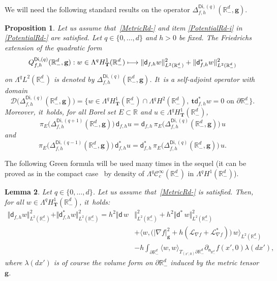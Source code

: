 \documentclass[10pt]{amsart}
\newcommand\mto{\mathchoice{\longmapsto}{\mapsto}{\mapsto}{\mapsto}}
\newcommand{\mbf}[1]{\mathbf{#1}}
\let\lp\langle
\let\rp\rangle
\let\pa\partial
\theoremstyle{plain}
\newtheorem{proposition}{Proposition}
\newtheorem{lemma}[proposition]{Lemma}
\theoremstyle{definition}
\begin{document}
We will need the following standard results on the operator
$\Delta_{f,h}^{\mathsf{Di},(q)}(\mathbb R^d_-,\mbf g)$.

\begin{proposition}\label{pr.pr1-d}
Let us assume that~\ref{MetricRd-} and item \eqref{PotentialRd-i} in
\ref{PotentialRd-} are satisfied. Let $q\in \{0,\ldots,d\}$
and $h>0$ be fixed. The
Friedrichs extension of the quadratic form
\begin{equation}\label{eq.fried-e}
Q_{f,h}^{\mathsf{Di},(q)}(\mathbb R^d_-,\mbf g): w\in \Lambda^qH^1_{\mbf T}(\mathbb R^d_-)
\mto \Vert \mathsf d_{f,h}w \Vert_{L^2(\mathbb R^d_-)}^2 + \Vert \mathsf d_{f,h}^*w \Vert_{L^2(\mathbb R^d_-)}^2
\end{equation}
on $\Lambda^qL^2(\mathbb R^d_-)$ is denoted by
$\Delta_{f,h}^{\mathsf{Di},(q)}(\mathbb R^d_-,\mbf g)$. It~is a
self-adjoint operator with domain
\[
\mathcal D \bigl(\Delta_{f,h}^{\mathsf{Di},(q)}(\mathbb R^d_-,\mbf
g) \bigr)=\big\{w\in \Lambda^qH^1_{\mbf T}(\mathbb R^d_-)\cap \Lambda^qH^2(\mathbb R^d_-), \ \mbf t \mathsf d_{f,h}^*w=0 \text{ on } \pa \mathbb R^d_-\big\}.
\]
Moreover, it~holds, for all Borel set $E\subset \mathbb R$ and $u\in
\Lambda^qH^1_{\mbf T}(\mathbb R^d_-)$,
\begin{equation}\label{eq.complexe1}
\pi_{E}\bigl(\Delta_{f,h}^{\mathsf{Di},(q+1)}(\mathbb R^d_-,\mbf g)\bigr)\, \mathsf d_{f,h}u=\mathsf d_{f,h}\, \pi_{E}\bigl(\Delta_{f,h}^{\mathsf{Di},(q)}(\mathbb R^d_-,\mbf g)\bigr) \, u
\end{equation}
and
\begin{equation}\label{eq.complexe2}
\pi_{E}\bigl(\Delta_{f,h}^{\mathsf{Di},(q-1)}(\mathbb R^d_-,\mbf g)\bigr)\, \mathsf d_{f,h}^*u=\mathsf d_{f,h}^*\, \pi_{E}\bigl(\Delta_{f,h}^{\mathsf{Di},(q)}(\mathbb R^d_-,\mbf g)\bigr) \, u.
\end{equation}
\end{proposition}

The following Green
formula will be used many times in the sequel (it can be proved as in the compact case~\cite[Lem.\,2.3.2]{helffer-nier-06} by density of $\Lambda^q\mathcal C^\infty_c(\mathbb R^d_-)$ in
$\Lambda^qH^1(\mathbb R^d_-)$).
\begin{lemma}\label{le.Green}
Let $q\in \{0,\ldots,d\}$. Let us assume that~\ref{MetricRd-} is satisfied.
Then, for all $w\in \Lambda^qH^1_{\mbf T}(\mathbb R^d_-)$, it~holds:
\begin{align*}
\Vert \mathsf d_{f,h}w \Vert_{L^2(\mathbb R^d_-)}^2 + \Vert \mathsf d_{f,h}^*w \Vert_{L^2(\mathbb R^d_-)}^2=h^2 \Vert \mathsf d \, w &\Vert_{L^2(\mathbb R^d_-)}^2 + h^2 \Vert \mathsf d^*\, w \Vert_{L^2(\mathbb R^d_-)}^2 \\
&+\big \lp w, \bigl(\vert \nabla f\vert_{\mbf g}^2 +h (\mathcal L_{\nabla f}+\mathcal L_{\nabla f}^*)\bigr)\, w\big \rp_{L^2(\mathbb R^d_-)}\\
& -h\int_{\pa \mathbb R^d_-}\langle w,w\rangle _{T_{(x',0)}\pa \mathbb R^d_-}\partial_{\mathsf n_{\mathbb R^d_-}}f(x',0) \lambda (dx'),
\end{align*}
where $\lambda (dx')$ is of course the volume form on $\pa \mathbb R^d_-$ induced by the metric tensor $\mbf g$.
\end{lemma}
\end{document}
